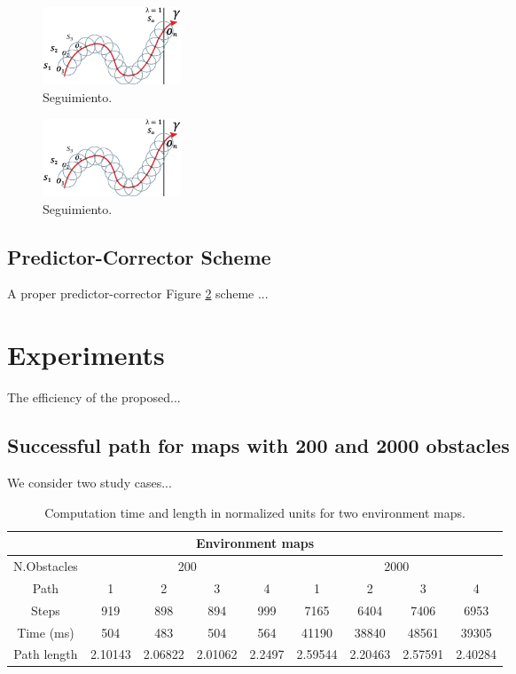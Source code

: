 \documentclass[conference]{IEEEtran}
\begin{document}
  \begin{figure}[H]
\begin{center}
\includegraphics[width=0.2\textwidth]{imagenes/hiper2.eps} 
\caption{ Seguimiento.}
\label{fig:hiper3}
\end{center}
\end{figure}    
  
\begin{figure}[H]
\begin{center}
\includegraphics[width=0.2\textwidth]{imagenes/hiper2.eps} 
\caption{ Seguimiento.}
\label{fig:hiper4}
\end{center}
\end{figure}    
  
\subsection*{Predictor-Corrector Scheme}
 A proper \cite{plc1} predictor-corrector Figure \ref{fig:hiper4} scheme \cite{Hector1, Gerardo1}...
  
 
 



\section{Experiments}

The efficiency of the \cite{Park-2008} proposed...
\subsection{Successful path for maps with 200 and 2000 obstacles}

We consider two study cases...

  \vspace{-0.1 cm}
\begin{table}[H]
\begin{center}
\resizebox{9cm}{!} {
\begin{tabular}{ |c|c|c|c|c|c|c|c|c| }
\hline
\multicolumn{9}{|c|}{Environment maps}\\
\hline
\multicolumn{1}{|c}{N.Obstacles}&\multicolumn{4}{|c}{200}&\multicolumn{4}{|c|}{2000}\\
\hline
Path&1&2&3&4&1&2&3&4\\
\hline
Steps&919&898&894&999&7165&6404&7406&6953\\
\hline
Time (ms)&504&483 &504&564&41190&38840&48561&39305\\
\hline
Path length&2.10143&2.06822&2.01062&2.2497&2.59544&2.20463&2.57591&2.40284\\
\hline
\end{tabular}
}
\end{center}
\caption{Computation time and length in normalized units for two environment maps.}
\label{table:tiempos}
\end{table}
\end{document}
